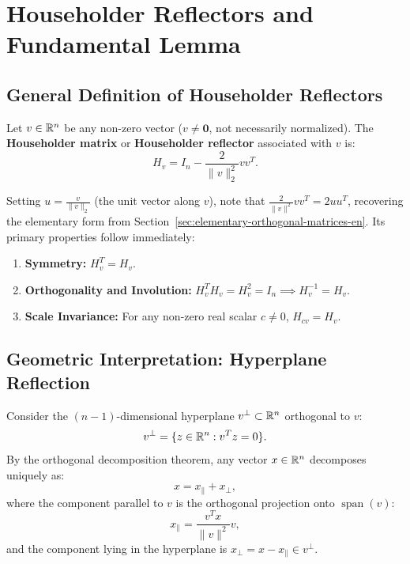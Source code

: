 \FloatBarrier
\section{Householder Reflectors and Fundamental Lemma}
\label{sec:householder-reflectors-lemma-en}

\subsection{General Definition of Householder Reflectors}

\begin{definition}
\label{def:householder-reflector-en}
Let $v \in \mathbb{R}^n$ be any non-zero vector ($v \neq \mathbf{0}$, not necessarily normalized). The \textbf{Householder matrix} or \textbf{Householder reflector} associated with $v$ is:
\begin{equation}
    H_v = I_n - \frac{2}{\|v\|_2^2} v v^T.
    \label{eq:householder-reflector-gen-en}
\end{equation}
\end{definition}

Setting $u = \frac{v}{\|v\|_2}$ (the unit vector along $v$), note that $\frac{2}{\|v\|^2} v v^T = 2 u u^T$, recovering the elementary form from Section~\ref{sec:elementary-orthogonal-matrices-en}. Its primary properties follow immediately:
\begin{enumerate}
    \item \textbf{Symmetry:} $H_v^T = H_v$.
    \item \textbf{Orthogonality and Involution:} $H_v^T H_v = H_v^2 = I_n \implies H_v^{-1} = H_v$.
    \item \textbf{Scale Invariance:} For any non-zero real scalar $c \neq 0$, $H_{c v} = H_v$.
\end{enumerate}

\subsection{Geometric Interpretation: Hyperplane Reflection}
Consider the $(n-1)$-dimensional hyperplane $v^\perp \subset \mathbb{R}^n$ orthogonal to $v$:
\begin{equation}
    v^\perp = \{z \in \mathbb{R}^n : v^T z = 0\}.
\end{equation}
By the orthogonal decomposition theorem, any vector $x \in \mathbb{R}^n$ decomposes uniquely as:
\begin{equation}
    x = x_\parallel + x_\perp,
\end{equation}
where the component parallel to $v$ is the orthogonal projection onto $\operatorname{span}(v)$:
\begin{equation}
    x_\parallel = \frac{v^T x}{\|v\|^2} v,
\end{equation}
and the component lying in the hyperplane is $x_\perp = x - x_\parallel \in v^\perp$.

